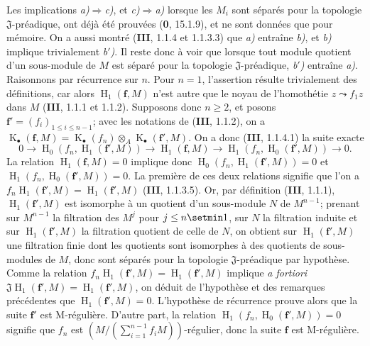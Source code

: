 Les implications \emph{a)}$\Rightarrow$\emph{c)}, et \emph{c)}$\Rightarrow$\emph{a)} lorsque les $M_i$ sont séparés pour la topologie $\mathfrak J$-préadique, ont déjà été prouvées (\textbf{0}, 15.1.9), et ne sont données que pour mémoire. On a aussi montré (\textbf{III}, 1.1.4 et 1.1.3.3) que \emph{a)} entraîne \emph{b)}, et \emph{b)} implique trivialement \emph{b$'$)}. Il reste donc à voir que lorsque tout module quotient d'un sous-module de $M$ est séparé pour la topologie $\mathfrak J$-préadique, \emph{b$'$)} entraîne \emph{a)}. Raisonnons par récurrence sur $n$. Pour $n=1$, l'assertion résulte trivialement des définitions, car alors $\operatorname{H}_1(\mathbf f,M)$ n'est autre que le noyau de l'homothétie $z\leadsto f_1z$ dans $M$ (\textbf{III}, 1.1.1 et 1.1.2). Supposons donc $n\geq2$, et posons $\mathbf f'=(f_i)_{1\leq i\leq n-1}$; avec les notations de (\textbf{III}, 1.1.2), on a $\operatorname{K}_\bullet(\mathbf f,M)=\operatorname{K}_\bullet(f_n)\otimes_A\operatorname{K}_\bullet(\mathbf f',M)$. On a donc (\textbf{III}, 1.1.4.1) la suite exacte
\begin{equation}
  0\longrightarrow\operatorname{H}_0(f_n,\operatorname{H}_1(\mathbf f',M))\longrightarrow\operatorname{H}_1(\mathbf f,M)\longrightarrow\operatorname{H}_1(f_n,\operatorname{H}_0(\mathbf f',M))\longrightarrow0.
  \tag{19.5.1.1}\label{IV.19.5.1.1}
\end{equation}
La relation $\operatorname{H}_1(\mathbf f,M)=0$ implique donc $\operatorname{H}_0(f_n,\operatorname{H}_1(\mathbf f',M))=0$ et $\operatorname{H}_1(f_n,\operatorname{H}_0(\mathbf f',M))=0$. La première de ces deux relations signifie que l'on a $f_n\operatorname{H}_1(\mathbf f',M)=\operatorname{H}_1(\mathbf f',M)$ (\textbf{III}, 1.1.3.5). Or, par définition (\textbf{III}, 1.1.1), $\operatorname{H}_1(\mathbf f',M)$ est isomorphe à un quotient d'un sous-module $N$ de $M^{n-1}$; prenant sur $M^{n-1}$ la filtration des $M^j$ pour $j\leq n\setmin 1$, sur $N$ la filtration induite et sur $\operatorname{H}_1(\mathbf f',M)$ la filtration quotient de celle de $N$, on obtient sur $\operatorname{H}_1(\mathbf f',M)$ une filtration finie dont les quotients sont isomorphes à des quotients de sous-modules de $M$, donc sont séparés pour la topologie $\mathfrak J$-préadique par hypothèse. Comme la relation $f_n\operatorname{H}_1(\mathbf f',M)=\operatorname{H}_1(\mathbf f',M)$ implique \emph{a fortiori} $\mathfrak J\operatorname{H}_1(\mathbf f',M)=\operatorname{H}_1(\mathbf f',M)$, on déduit de l'hypothèse et des remarques précédentes que $\operatorname{H}_1(\mathbf f',M)=0$. L'hypothèse de récurrence prouve alors que la suite $\mathbf f'$ est M-régulière. D'autre part, la relation $\operatorname{H}_1(f_n,\operatorname{H}_0(\mathbf f',M))=0$ signifie que $f_n$ est $(M/(\sum_{i=1}^{n-1}f_iM))$-régulier, donc la suite $\mathbf f$ est M-régulière.

